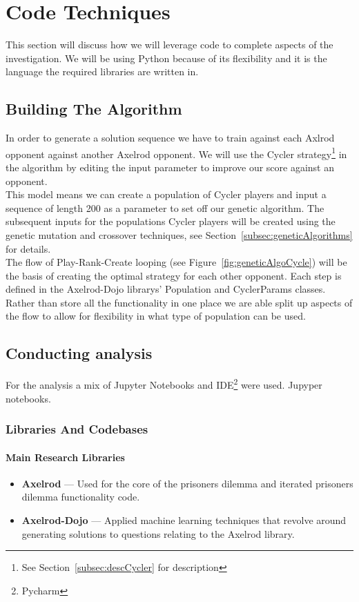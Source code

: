\section{Code Techniques}\label{sec:codeTechniques}
This section will discuss how we will leverage code to complete aspects of the investigation.
We will be using Python because of its flexibility and it is the language the required libraries are written in.

\subsection{Building The Algorithm}\label{subsec:buildingTheAlgorthem}
In order to generate a solution sequence we have to train against each Axlrod opponent against another Axelrod opponent.
We will use the Cycler strategy\footnote{See Section~\ref{subsec:descCycler} for description} in the algorithm by editing the input parameter to improve our score against an opponent.\\

This model means we can create a population of Cycler players and input a sequence of length 200 as a parameter to set off our genetic algorithm.
The subsequent inputs for the populations Cycler players will be created using the genetic mutation and crossover techniques, see Section~\ref{subsec:geneticAlgorithms} for details.\\

The flow of Play-Rank-Create looping (see Figure~\ref{fig:geneticAlgoCycle}) will be the basis of creating the optimal strategy for each other opponent.
Each step is defined in the Axelrod-Dojo librarys' Population and CyclerParams classes.
Rather than store all the functionality in one place we are able split up aspects of the flow to allow for flexibility in what type of population can be used.

\subsection{Conducting analysis}\label{subsec:conductingAnalysis}
For the analysis a mix of Jupyter Notebooks and IDE\footnote{Pycharm} were used.
Jupyper notebooks.

\subsubsection{Libraries And Codebases}
\paragraph{Main Research Libraries}
\begin{itemize}
    \item \textbf{Axelrod} --- Used for the core of the prisoners dilemma and iterated prisoners dilemma functionality code.
    \item \textbf{Axelrod-Dojo} --- Applied machine learning techniques that revolve around generating solutions to questions relating to the Axelrod library.
\end{itemize}

